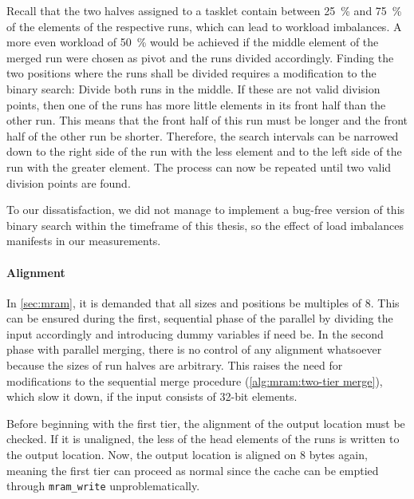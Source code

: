 Recall that the two halves assigned to a tasklet contain between \qty{25}{\percent} and \qty{75}{\percent} of the elements of the respective runs, which can lead to workload imbalances.
A more even workload of \qty{50}{\percent} would be achieved if the middle element of the merged run were chosen as pivot and the runs divided accordingly.
Finding the two positions where the runs shall be divided requires a modification to the binary search:
Divide both runs in the middle.
If these are not valid division points, then one of the runs has more little elements in its front half than the other run.
This means that the front half of this run must be longer and the front half of the other run be shorter.
Therefore, the search intervals can be narrowed down to the right side of the run with the less element and to the left side of the run with the greater element.
The process can now be repeated until two valid division points are found.

To our dissatisfaction, we did not manage to implement a bug-free version of this binary search within the timeframe of this thesis, so the effect of load imbalances manifests in our measurements.


\paragraph{Alignment}
In \cref{sec:mram}, it is demanded that all sizes and positions be multiples of 8.
This can be ensured during the first, sequential phase of the parallel \MS{} by dividing the input accordingly and introducing dummy variables if need be.
In the second phase with parallel merging, there is no control of any alignment whatsoever because the sizes of run halves are arbitrary.
This raises the need for modifications to the sequential merge procedure (\cref{alg:mram:two-tier merge}), which slow it down, if the input consists of 32-bit elements.

Before beginning with the first tier, the alignment of the output location must be checked.
If it is unaligned, the less of the head elements of the runs is written to the output location.
Now, the output location is aligned on 8 bytes again, meaning the first tier can proceed as normal since the cache can be emptied through \lstinline|mram_write| unproblematically.

